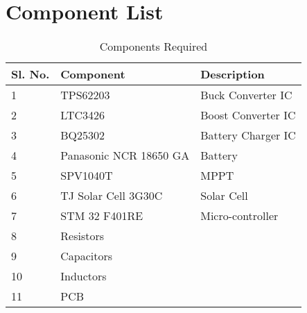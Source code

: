 \chapter{Component List}
\begin{table}[h]
	\begin{center}
	\begin{tabular}{|l|l|l|}
		\hline
		{\bf Sl. No.} & {\bf Component} & {\bf Description} \\ \hline
1 & TPS62203 & Buck Converter IC \\ \hline
2 & LTC3426 & Boost Converter IC \\ \hline
3 & BQ25302 & Battery Charger IC \\ \hline
4 & Panasonic NCR 18650 GA & Battery \\ \hline
5 & SPV1040T & MPPT \\ \hline
6 & TJ Solar Cell 3G30C & Solar Cell \\ \hline
7 & STM 32 F401RE & Micro-controller \\ \hline
8 & Resistors &  \\ \hline
9 & Capacitors &  \\ \hline
10 & Inductors &  \\ \hline
11 & PCB &  \\ \hline
	\end{tabular}
\caption{Components Required}
\label{table:3}
	\end{center}
\end{table}